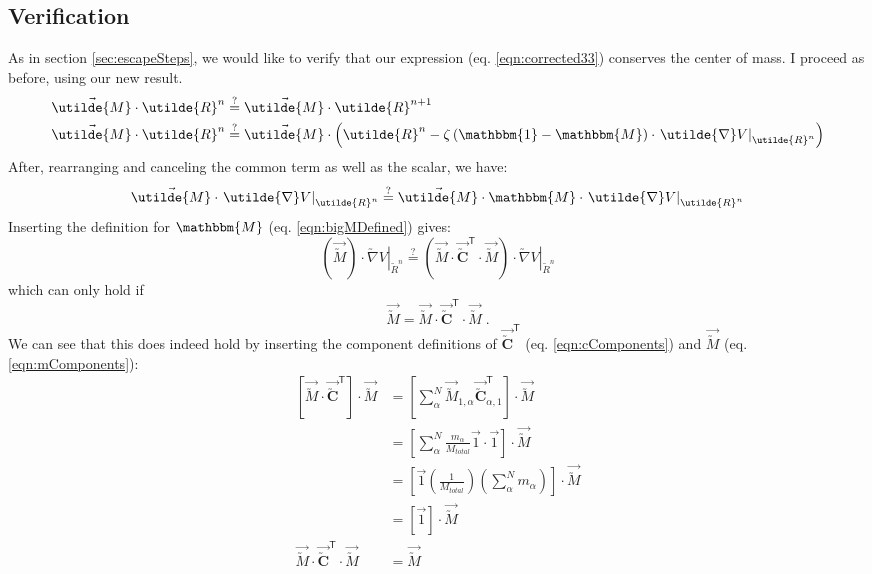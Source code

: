 \documentclass[letterpaper,12pt]{article}
\newcommand{\trans}[1]{{#1}^{\mathsf{T}}}
\newcommand{\scmat}[1]{\vec{\utilde{#1}}}
\newcommand{\cvec}[1]{\utilde{#1}}
\newcommand{\svec}[1]{\vec{#1}}
\newcommand{\refeq}[1]{eq. \ref{eqn:#1}}
\begin{document}
\subsection{Verification}
As in section \ref{sec:escapeSteps}, we would like to verify that our expression (\refeq{corrected33}) conserves the center of mass. I proceed as before, using our new result.
\begin{equation}
\begin{aligned}
\scmat{M} \cdot \cvec{R}^{n} &\stackrel{?}{=} \scmat{M} \cdot \cvec{R}^{n+1} \\
\scmat{M} \cdot \cvec{R}^{n} &\stackrel{?}{=} \scmat{M} \cdot \left( \cvec{R}^{n} - \zeta \left( \mathbbm{1} - \mathbbm{M} \right) \cdot \left. \cvec{\nabla}V\right|_{\cvec{R}^{n}} \right)
\end{aligned}
\end{equation}
After, rearranging and canceling the common term as well as the scalar, we have:
\begin{equation}
\scmat{M} \cdot \left. \cvec{\nabla}V\right|_{\cvec{R}^{n}} \stackrel{?}{=} \scmat{M} \cdot \mathbbm{M} \cdot \left. \cvec{\nabla}V\right|_{\cvec{R}^{n}}
\end{equation}
Inserting the definition for $\mathbbm{M}$ (\refeq{bigMDefined}) gives:
\begin{equation}
\left( \scmat{M} \right) \cdot \left. \cvec{\nabla}V\right|_{\cvec{R}^{n}} \stackrel{?}{=} 
\left( \scmat{M} \cdot \trans{\scmat{\mathbf{C}}} \cdot \scmat{M} \right) \cdot \left. \cvec{\nabla}V\right|_{\cvec{R}^{n}}
\end{equation}
which can only hold if
\begin{equation}
\scmat{M} = \scmat{M} \cdot \trans{\scmat{\mathbf{C}}} \cdot \scmat{M} \; .
\end{equation}
We can see that this does indeed hold by inserting the component definitions of $\trans{\scmat{\mathbf{C}}}$ (\refeq{cComponents}) and $\scmat{M}$ (\refeq{mComponents}):
\begin{equation}
\begin{aligned}
\left[ \scmat{M} \cdot \trans{\scmat{\mathbf{C}}} \right] \cdot \scmat{M} &= \left[ \sum_{\alpha}^{N} \scmat{M}_{1,\alpha} \trans{\scmat{\mathbf{C}}}_{\alpha,1} \right] \cdot \scmat{M}\\
&= \left [\sum_{\alpha}^{N} \frac{m_{\alpha}}{M_{total}} \svec{1} \cdot \svec{1} \right] \cdot \scmat{M}\\
&= \left[ \svec{1} \left( \frac{1}{M_{total}} \right) \left(\sum_{\alpha}^{N} m_{\alpha} \right) \right] \cdot \scmat{M}\\
&= \left[ \svec{1} \right] \cdot \scmat{M} \\
\scmat{M} \cdot \trans{\scmat{\mathbf{C}}} \cdot \scmat{M} &= \scmat{M}
\end{aligned}
\end{equation}
\end{document}
